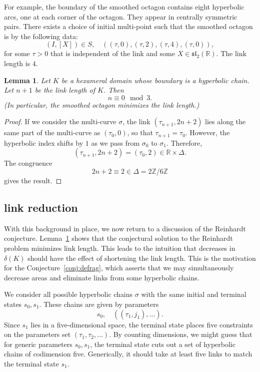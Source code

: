 \documentclass[11pt]{amsart}
\newtheorem{lemma}[equation]{Lemma}
\newcommand{\ring}[1]{\mathbb{#1}}
\def\deltalat{\mathbb\delta}  %
\def\rZ{{\ring{Z}}}
\def\rR{{\ring{R}}}
\def\ta{{\tau}}
\begin{document}
For example, the boundary of the smoothed octagon contains eight
hyperbolic arcs, one at each corner of the octagon. They appear in
centrally symmetric pairs.  There exists a choice of initial
multi-point such that the smoothed octagon is by the following data:
$$
(I,[X])\in S,\quad ((\ta,0),(\ta,2),(\ta,4),(\ta,0)),
$$
for some $\ta>0$ that is independent of the link and some
$X\in\mathfrak{sl}_2(\rR)$.
The link length is $4$.

\begin{lemma}\label{lemma:link}  Let $K$ be a hexameral domain whose boundary is
a hyperbolic chain.  Let $n+1$ be the link length of $K$.  Then
$$n\equiv 0 \mod 3.$$
(In particular, the smoothed octagon minimizes the link length.)
\end{lemma}

\begin{proof} If we consider the multi-curve $\sigma$, the link
$(\ta_{n+1},2n+2)$ lies along the same part of the multi-curve as $(\ta_0,0)$,
so that $\ta_{n+1}=\ta_0$.  However, the hyperbolic index shifts by
$1$ as we pass from $\sigma_0$ to $\sigma_1$.  Therefore,
$$(\ta_{n+1},2n+2) = (\ta_0,2)\in \rR\times \Delta.$$
The congruence $$2n+2 \equiv 2\in \Delta = 2\rZ/6\rZ$$
gives the result.
\end{proof}

\subsection{link reduction}

With this background in place, we now return to a discussion of the
Reinhardt conjecture.  Lemma~\ref{lemma:link} shows that the
conjectural solution to the Reinhardt problem minimizes link
length.  This leads to the intuition 
that decreases in $\deltalat(K)$ should have
the effect of shortening the link length.  This is the motivation
for the Conjecture~\ref{conj:defrag}, which asserts that we may
simultaneously decrease areas and eliminate links
from some hyperbolic chains.   

We consider all possible hyperbolic chains $\sigma$ with the same
initial and terminal states $s_0,s_1$.  These chains are given by
parameters
  $$
  s_0,\quad ((\ta_1,j_1),\ldots).
  $$
  Since $s_1$ lies in a five-dimensional space, the terminal state
  places five constraints on the parameters set
  $(\ta_1,\ta_2,\ldots)$.  By counting dimensions, we might guess that
  for generic parameters $s_0,s_1$, the terminal state cuts out a set
  of hyperbolic chains of codimension five.  Generically, it should
  take at least five links to match the terminal state $s_1$.
\end{document}

